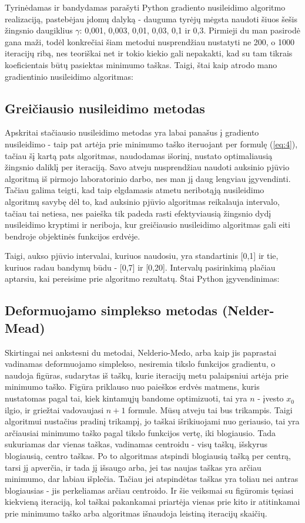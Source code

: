 \documentclass{article}
\begin{document}
Tyrinėdamas ir bandydamas parašyti Python gradiento nusileidimo algoritmo realizaciją, pastebėjau įdomų dalyką - dauguma tyrėjų mėgsta naudoti šiuos šešis žingsnio daugiklius $\gamma$: 0,001, 0,003, 0,01, 0,03, 0,1 ir 0,3. Pirmieji du man pasirodė gana maži, todėl konkrečiai šiam metodui nusprendžiau nustatyti ne 200, o 1000 iteracijų ribą, nes teoriškai net ir tokio kiekio gali nepakakti, kad su tam tikrais koeficientais būtų pasiektas minimumo taškas. Taigi, štai kaip atrodo mano gradientinio nusileidimo algoritmas:
\subsection{Greičiausio nusileidimo metodas}
Apskritai stačiausio nusileidimo metodas yra labai panašus į gradiento nusileidimo - taip pat artėja prie minimumo taško iteruojant per formulę (\ref{eq:4}), tačiau šį kartą pats algoritmas, naudodamas išorinį, nustato optimaliausią žingsnio daliklį per iteraciją. Savo atveju nusprendžiau naudoti auksinio pjūvio algoritmą iš pirmojo laboratorinio darbo, nes man jį daug lengviau įgyvendinti. Tačiau galima teigti, kad taip elgdamasis atmetu neribotąją nusileidimo algoritmų savybę dėl to, kad auksinio pjūvio algoritmas reikalauja intervalo, tačiau tai netiesa, nes paieška tik padeda rasti efektyviausią žingsnio dydį nusileidimo kryptimi ir neriboja, kur greičiausio nusileidimo algoritmas gali eiti bendroje objektinės funkcijos erdvėje.

Taigi, aukso pjūvio intervalai, kuriuos naudosiu, yra standartinis [0,1] ir tie, kuriuos radau bandymų būdu - [0,7] ir [0,20]. Intervalų pasirinkimą plačiau aptarsiu, kai pereisime prie algoritmo rezultatų. Štai Python įgyvendinimas:
\subsection{Deformuojamo simplekso metodas (Nelder-Mead)}
Skirtingai nei ankstesni du metodai, Nelderio-Medo, arba kaip jis paprastai vadinamas deformuojamo simplekso, nesiremia tikslo funkcijos gradientu, o naudoja figūras, sudarytas iš taškų, kurie iteracijų metu palaipsniui artėja prie minimumo taško. Figūra priklauso nuo paieškos erdvės matmens, kuris nustatomas pagal tai, kiek kintamųjų bandome optimizuoti, tai yra $n$ - įvesto $x_{0}$ ilgio, ir griežtai vadovaujasi $n+1$ formule. Mūsų atveju tai bus trikampis. Taigi algoritmui nustačius pradinį trikampį, jo taškai išrikiuojami nuo geriausio, tai yra arčiausiai minimumo taško pagal tikslo funkcijos vertę, iki blogiausio. Tada sukuriamas dar vienas taškas, vadinamas centroidu - visų taškų, išskyrus blogiausią, centro taškas. Po to algoritmas atspindi blogiausią tašką per centrą, tarsi jį apverčia, ir tada jį išsaugo arba, jei tas naujas taškas yra arčiau minimumo, dar labiau išplečia. Tačiau jei atspindėtas taškas yra toliau nei antras blogiausias - jis perkeliamas arčiau centroido. Ir šie veiksmai su figūromis tęsiasi kiekvieną iteraciją, kol taškai pakankamai priartėja vienas prie kito ir atitinkamai prie minimumo taško arba algoritmas išnaudoja leistiną iteracijų skaičių.
\end{document}
